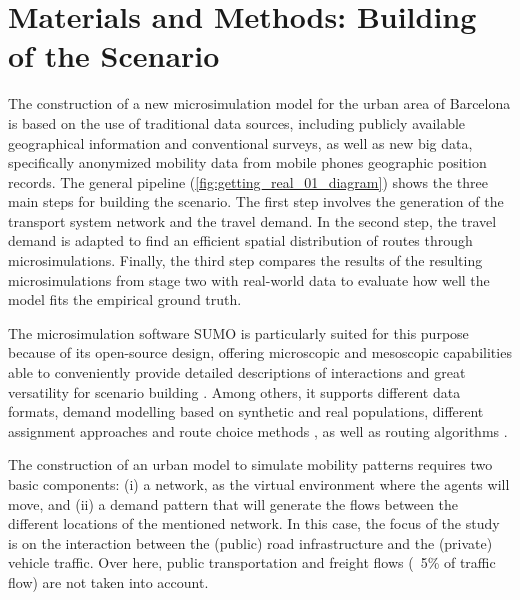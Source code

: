 \section{Materials and Methods: Building of the Scenario}
\label{sec:GR_2_mats_and_meths}

The construction of a new microsimulation model for the urban area of Barcelona is based on the use of traditional data sources, including publicly available geographical information and conventional surveys, as well as new big data, specifically anonymized mobility data from mobile phones geographic position records. The general pipeline (\autoref{fig:getting_real_01_diagram}) shows the three main steps for building the scenario. The first step involves the generation of the transport system network and the travel demand. In the second step, the travel demand is adapted to find an efficient spatial distribution of routes through microsimulations. Finally, the third step compares the results of the resulting microsimulations from stage two with real-world data to evaluate how well the model fits the empirical ground truth.

The microsimulation software SUMO \citep{Lopez2018} is particularly suited for this purpose because of its open-source design, offering microscopic and mesoscopic capabilities able to conveniently provide detailed descriptions of interactions \citep{Treiber2013} and great versatility for scenario building \citep{Diallo2021,Urquiza-Aguiar2020}. Among others, it supports different data formats, demand modelling based on synthetic and real populations, different assignment approaches and route choice methods \citep{Gawron1998,GermanAerospaceCenterDLRandothers2021e}, as well as routing algorithms \citep{Dijkstra1959,Hart1968,Geisberger2008}.

The construction of an urban model to simulate mobility patterns requires two basic components: (i) a network, as the virtual environment where the agents will move, and (ii) a demand pattern that will generate the flows between the different locations of the mentioned network. In this case, the focus of the study is on the interaction between the (public) road infrastructure and the (private) vehicle traffic. Over here, public transportation and freight flows (~5\% of traffic flow) are not taken into account.

